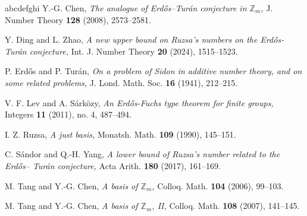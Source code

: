 \documentclass[12pt,a4paper,reqno]{amsart}
\numberwithin{equation}{section}
\theoremstyle{plain}
\theoremstyle{definition}
\begin{document}
	
	\begin{thebibliography}{abcdefghi}
Y.-G. Chen, {\it The analogue of Erd\H os--Tur\'an conjecture in $\mathbb{Z}_m$,} J. Number Theory {\bf128}
(2008), 2573--2581.

Y. Ding and L. Zhao, {\it A new upper bound on Ruzsa's numbers on the Erd\H os-Tur\'an conjecture,} Int. J. Number Theory {\bf20} (2024), 1515--1523.

P. Erd\H os and P. Tur\'an, {\it On a problem of Sidon in additive number theory, and on
some related problems,} J. Lond. Math. Soc. {\bf16} (1941), 212--215.

V. F. Lev and A. S\'ark\"ozy, {\it An Erd\H os-Fuchs type theorem for finite groups,} Integers {\bf11}
(2011), no. 4, 487--494.

I. Z. Ruzsa, {\it A just basis,} Monatsh. Math. {\bf109} (1990), 145--151.

C. S\'andor and Q.-H. Yang, {\it A lower bound of Ruzsa's number related to the Erd\H os--
Tur\'an conjecture,} Acta Arith. {\bf180} (2017), 161--169.

M. Tang and Y.-G. Chen, {\it A basis of $\mathbb{Z}_m$,} Colloq. Math. {\bf104} (2006), 99--103.

M. Tang and Y.-G. Chen, {\it A basis of $\mathbb{Z}_m$, II,} Colloq. Math. {\bf108} (2007), 141--145.

\end{thebibliography}
\end{document}
